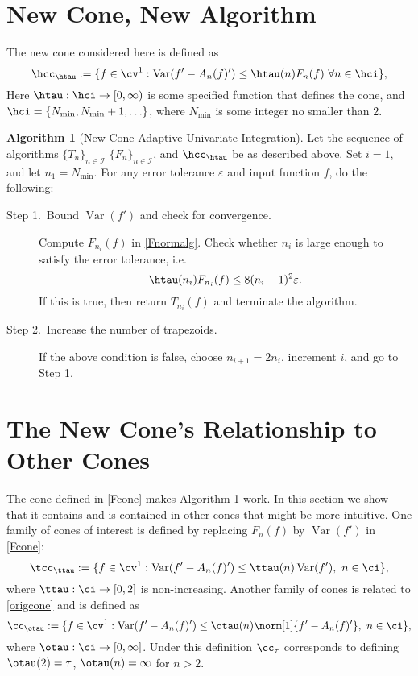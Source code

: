 \documentclass[]{elsarticle}
\DeclareMathOperator{\Var}{Var}
\theoremstyle{definition}
\newtheorem{algo}{Algorithm}
\theoremstyle{remark}
\begin{document}
\section{New Cone, New Algorithm}
The new cone considered here is defined as
\begin{equation} \label{Fcone}
\hcc_{\htau}:= \{ f \in \cv^1 :  \Var(f'-A_n(f)') \le \htau(n) F_n(f) \ \forall n \in \hci \},
\end{equation}
Here $\htau : \hci \to [0,\infty)$ is some specified function that defines the cone, and $\hci=\{N_{\min}, N_{\min}+1, \ldots \}$, where $N_{\min}$ is some integer no smaller than $2$.  
\begin{algo}[New Cone Adaptive Univariate Integration] \label{newconealgo}
Let the sequence of algorithms $\{T_n\}_{n\in \mathcal{I}}$ $\{F_n\}_{n\in \mathcal{I}}$, and $\hcc_{\htau}$ be as described above.  Set $i=1$, and let $n_1=N_{\min}$. For any error tolerance $\varepsilon$ and input function $f$, do the following:
\begin{description}
\item[Step 1.\ Bound {$\Var(f')$} and check for convergence.] Compute $F_{n_i}(f)$ in \eqref{Fnormalg}.  Check whether $n_i$ is large enough to satisfy the error tolerance, i.e.
    \begin{equation*}
      \htau(n_i) F_{n_i}(f) \le 8 (n_i-1)^2 \varepsilon.
    \end{equation*}
If this is true, then return $T_{n_i}(f)$ and terminate the algorithm.   

\item[Step 2.\ Increase the number of trapezoids.]  If the above condition is false, choose $n_{i+1}=2n_i$, increment $i$, and go to Step 1.
\end{description}
\end{algo}


\section{The New Cone's Relationship to Other Cones}

The cone defined in \eqref{Fcone} makes Algorithm \ref{newconealgo} work.  In this section we show that it contains and is contained in other cones that might be more intuitive.  One family of cones of interest is defined by replacing $F_n(f)$ by $\Var(f')$ in \eqref{Fcone}:
\begin{equation}\label{varcone}
\tcc_{\ttau}:=\{f\in \cv^{1}:\Var(f'-A_n(f)')\leq\ttau(n)\Var(f'), \ n \in  \ci\},
\end{equation}
where $\ttau:\ci \to [0,2]$ is non-increasing.  Another family of cones is related to \eqref{origcone} and is defined as
\begin{equation}\label{origconefamily}
\cc_{\otau}:=\{f\in \cv^{1}:\Var(f'-A_n(f)')\leq\otau(n)\norm[1]{f'-A_n(f)'}, \ n \in  \ci\},
\end{equation}
where $\otau:\ci \to [0,\infty]$.  Under this definition $\cc_{\tau}$ corresponds to defining $\otau(2)=\tau$, $\otau(n)=\infty$ for $n>2$.
\end{document}
